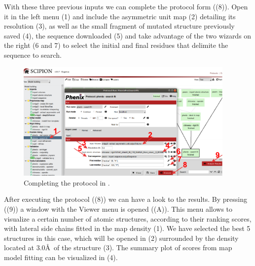   With these three previous inputs we can complete the  protocol form ((8)). Open it in the \scipion left menu (1) and include the asymmetric unit map (2) detailing its resolution (3), as well as the small fragment of mutated structure previously saved (4), the sequence downloaded (5) and take advantage of the two wizards on the right (6 and 7) to select the initial and final residues that delimite the sequence to search. 
  
  
   \begin{figure}[H]
  \centering 
  \captionsetup{width=.9\linewidth} 
  \includegraphics[width=0.95\textwidth]{Images/Fig_search_fit_3.pdf}
  \caption{Completing the  protocol in \scipion.}
  \label{fig:phenix_search_fit_3}
  \end{figure}
  
  After executing the  protocol ((8)) we can have a look to the results. By pressing  ((9)) a window with the Viewer menu is opened ((A)). This menu allows to visualize a certain number of  atomic structures, according to their ranking scores, with lateral side chains fitted in the map density (1). We have selected the best 5 structures in this case, which will be opened in \chimera (2) surrounded by the density located at 3.0\AA\ of the structure (3). The summary plot of scores from map model fitting can be visualized in (4).
  
